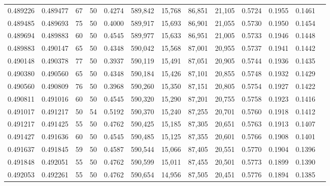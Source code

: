 \begin{tabular}{rrrrrrrrrrrrr}
0.489226 & 0.489477 &    67 &  50 &                                     0.4274 & 589,842 &  15,768 &  86,851 &  21,105 & 0.5724 & 0.1955 & 0.1461 \\
0.489485 & 0.489693 &    75 &  50 &                                     0.4000 & 589,917 &  15,693 &  86,901 &  21,055 & 0.5730 & 0.1950 & 0.1454 \\
0.489694 & 0.489883 &    60 &  50 &                                     0.4545 & 589,977 &  15,633 &  86,951 &  21,005 & 0.5733 & 0.1946 & 0.1448 \\
0.489883 & 0.490147 &    65 &  50 &                                     0.4348 & 590,042 &  15,568 &  87,001 &  20,955 & 0.5737 & 0.1941 & 0.1442 \\
0.490148 & 0.490378 &    77 &  50 &                                     0.3937 & 590,119 &  15,491 &  87,051 &  20,905 & 0.5744 & 0.1936 & 0.1435 \\
0.490380 & 0.490560 &    65 &  50 &                                     0.4348 & 590,184 &  15,426 &  87,101 &  20,855 & 0.5748 & 0.1932 & 0.1429 \\
0.490560 & 0.490809 &    76 &  50 &                                     0.3968 & 590,260 &  15,350 &  87,151 &  20,805 & 0.5754 & 0.1927 & 0.1422 \\
0.490811 & 0.491016 &    60 &  50 &                                     0.4545 & 590,320 &  15,290 &  87,201 &  20,755 & 0.5758 & 0.1923 & 0.1416 \\
0.491017 & 0.491217 &    50 &  54 &                                     0.5192 & 590,370 &  15,240 &  87,255 &  20,701 & 0.5760 & 0.1918 & 0.1412 \\
0.491217 & 0.491425 &    55 &  50 &                                     0.4762 & 590,425 &  15,185 &  87,305 &  20,651 & 0.5763 & 0.1913 & 0.1407 \\
0.491427 & 0.491636 &    60 &  50 &                                     0.4545 & 590,485 &  15,125 &  87,355 &  20,601 & 0.5766 & 0.1908 & 0.1401 \\
0.491637 & 0.491845 &    59 &  50 &                                     0.4587 & 590,544 &  15,066 &  87,405 &  20,551 & 0.5770 & 0.1904 & 0.1396 \\
0.491848 & 0.492051 &    55 &  50 &                                     0.4762 & 590,599 &  15,011 &  87,455 &  20,501 & 0.5773 & 0.1899 & 0.1390 \\
0.492053 & 0.492261 &    55 &  50 &                                     0.4762 & 590,654 &  14,956 &  87,505 &  20,451 & 0.5776 & 0.1894 & 0.1385 \\

\end{tabular}
